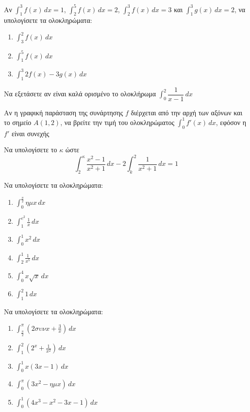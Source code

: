 \documentclass{../presentation}
\begin{document}
\begin{askisi}
  Αν $\int_{1}^{3}f(x)\,dx=1$, $\int_{2}^{5}f(x)\,dx=2$, $\int_{2}^{3}f(x)\,dx=3$ και $\int_{1}^{3}g(x)\,dx=2$, να υπολογίσετε τα ολοκληρώματα:
  \begin{enumerate}[<+->]
    \item $\int_{3}^{2}f(x)\,dx$
    \item $\int_{1}^{5}f(x)\,dx$
    \item $\int_{1}^{3}2f(x)-3g(x)\,dx$
  \end{enumerate}
\end{askisi}

\begin{askisi}
  Να εξετάσετε αν είναι καλά ορισμένο το ολοκλήρωμα $\int_{0}^{2}\dfrac{1}{x-1}\, dx$
\end{askisi}

\begin{askisi}
  Αν η γραφική παράσταση της συνάρτησης $f$ διέρχεται από την αρχή των αξόνων και το σημείο $Α(1,2)$, να βρείτε την τιμή του ολοκληρώματος $\int_{0}^{1}f'(x)\,dx$, εφόσον η $f'$ είναι συνεχής
\end{askisi}

\begin{askisi}
  Να υπολογίσετε το $κ$ ώστε
  $$\int_{2}^{κ}\frac{x^2-1}{x^2+1}\, dx-2\int_{k}^{2}\frac{1}{x^2+1}\, dx=1$$
\end{askisi}

\begin{askisi}
  Να υπολογίσετε τα ολοκληρώματα:
  \begin{enumerate}[<+->]
    \item $\int_{0}^{\frac{π}{2}}ημx\,dx$
    \item $\int_{1}^{e^2}\frac{1}{x}\,dx$
    \item $\int_{0}^{1}x^2\,dx$
    \item $\int_{2}^{1}\frac{1}{x^5}\,dx$
    \item $\int_{0}^{4}x\sqrt{x}\,dx$
    \item $\int_{1}^{2}1\,dx$
  \end{enumerate}
\end{askisi}

\begin{askisi}
  Να υπολογίσετε τα ολοκληρώματα:
  \begin{enumerate}[<+->]
    \item $\int_{\frac{π}{2}}^{π}\left( 2συνx+\frac{3}{x} \right)\,dx$
    \item $\int_{1}^{2}\left( 2^x+\frac{1}{x^2} \right)\,dx$
    \item $\int_{0}^{1}x(3x-1)\,dx$
    \item $\int_{0}^{π}(3x^2-ημx)\,dx$
    \item $\int_{0}^{1}(4x^3-x^2-3x-1)\,dx$
  \end{enumerate}
\end{askisi}
\end{document}
